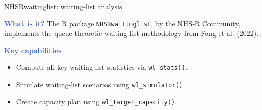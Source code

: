 \documentclass{beamer}
\let\oldtextbf\textbf
\renewcommand{\textbf}[1]{\textcolor{RoyalBlue}{\oldtextbf{#1}}}
\begin{document}
\begin{frame}{NHSRwaitinglist: waiting-list analysis}

  \textbf{What is it?} 
  The R package {\tt NHSRwaitinglist}, by the NHS‑R Community, implements the queue-theoretic waiting-list methodology from Fong et al. (2022).  %

\begin{center}
\end{center}

  \vspace{1em}
  \textbf{Key capabilities}
  \begin{itemize}
    \item Compute all key waiting-list statistics via {\tt wl\_stats()}. %
    \item Simulate waiting-list scenarios using {\tt wl\_simulator()}. %
    \item Create capacity plan using {\tt wl\_target\_capacity()}. %
  \end{itemize}



\end{frame}
\end{document}
